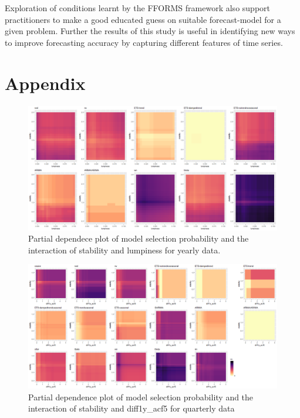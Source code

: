 \documentclass[11pt,a4paper,]{article}
\begin{document}
Exploration of conditions learnt by the FFORMS framework also support
practitioners to make a good educated guess on suitable forecast-model
for a given problem. Further the results of this study is useful in
identifying new ways to improve forecasting accuracy by capturing
different features of time series.

\newpage

\section*{Appendix}\label{appendix}

\begin{figure}
\centering
\includegraphics{figures/ytwopdp-1.png}
\caption{\label{fig:ytwopdp}Partial dependece plot of model selection
probability and the interaction of stability and lumpiness for yearly
data.}
\end{figure}

\begin{figure}
\centering
\includegraphics{figures/qtwopdp-1.png}
\caption{\label{fig:qtwopdp}Partial dependence plot of model selection
probability and the interaction of stability and diff1y\_acf5 for
quarterly data}
\end{figure}
\end{document}
